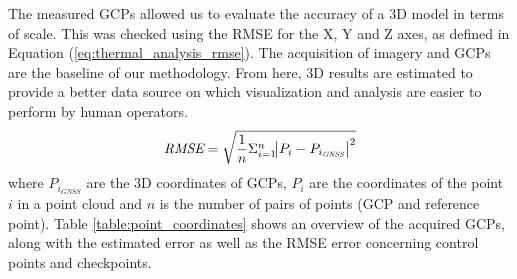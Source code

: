The measured GCPs allowed us to evaluate the accuracy of a 3D model in terms of scale. This was checked using the RMSE for the X, Y and Z axes, as defined in Equation (\ref{eq:thermal_analysis_rmse}). The acquisition of imagery and GCPs are the baseline of our methodology. From here, 3D results are estimated to provide a better data source on which visualization and analysis are easier to perform by human operators.
\begin{equation}
\label{eq:thermal_analysis_rmse}
\textit{RMSE} = \sqrt{\frac{1}{n}\Sigma_{i=1}^{n}{\abs{P_{i} - P_{{i_{\textit{GNSS}}}}}^2}}
\end{equation}
where $P_{i_{\textit{GNSS}}}$ are the 3D coordinates of GCPs, $P_{i}$ are the coordinates of the point $i$ in a point cloud and $n$ is the number of pairs of points (GCP and reference point). Table \ref{table:point_coordinates} shows an overview of the acquired GCPs, along with the estimated error as well as the RMSE error concerning control points and checkpoints.


